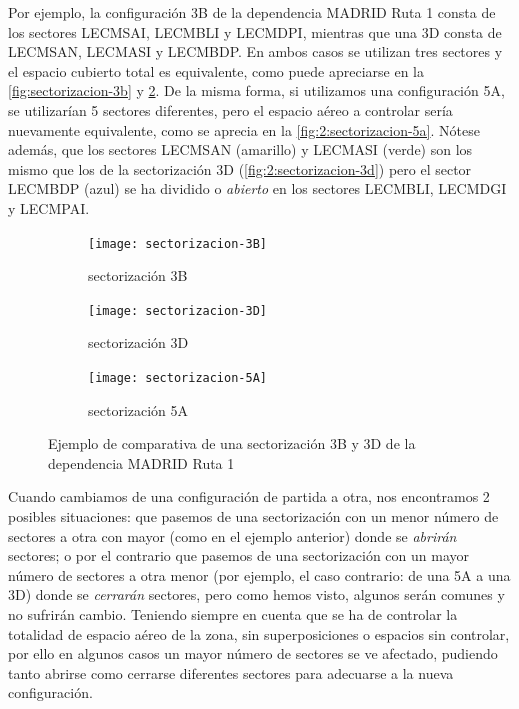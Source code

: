Por ejemplo, la configuración 3B de la dependencia MADRID Ruta 1 consta de los sectores LECMSAI, LECMBLI y LECMDPI, mientras que una 3D consta de LECMSAN, LECMASI y LECMBDP. En ambos casos se utilizan tres sectores y el espacio cubierto total es equivalente, como puede apreciarse en la \autoref{fig:sectorizacion-3b} y \ref{fig:2:sectorizacion-3d}.
De la misma forma, si utilizamos una configuración 5A, se utilizarían 5 sectores diferentes, pero el espacio aéreo a controlar sería nuevamente equivalente, como se aprecia en la \autoref{fig:2:sectorizacion-5a}.
Nótese además, que los sectores LECMSAN (amarillo) y LECMASI (verde) son los mismo que los de la sectorización 3D (\autoref{fig:2:sectorizacion-3d}) pero el sector LECMBDP (azul) se ha dividido o \textit{abierto} en los sectores LECMBLI, LECMDGI y LECMPAI.

\begin{figure}[htbp]
    \centering
    \begin{subfigure}{\linewidth}
        \centering
        \texttt{[image: sectorizacion-3B]}
        \caption{sectorización 3B\linebreak}
        \label{fig:sectorizacion-3b}
    \end{subfigure}

    \begin{subfigure}{\linewidth}
        \centering
        \texttt{[image: sectorizacion-3D]}
        \caption{sectorización 3D\linebreak}
        \label{fig:2:sectorizacion-3d}
    \end{subfigure}

    \begin{subfigure}{\linewidth}
        \centering
        \texttt{[image: sectorizacion-5A]}
        \caption{sectorización 5A}
        \label{fig:2:sectorizacion-5a}
    \end{subfigure}

    \caption[Ejemplo de sectorización 3B y 3D de la dependencia MADRID Ruta 1]{Ejemplo de comparativa de una 
    sectorización 3B y 3D 
    de la dependencia MADRID Ruta 1}
    \label{fig:2:comparativa3B-3D}
\end{figure}


Cuando cambiamos de una configuración de partida a otra, nos encontramos 2 posibles situaciones: que pasemos de una sectorización con un menor número de sectores a otra con mayor (como en el ejemplo anterior) donde se \textit{abrirán} sectores; o por el contrario que pasemos de una sectorización con un mayor número de sectores a otra menor (por ejemplo, el caso contrario: de una 5A a una 3D) donde se \textit{cerrarán} sectores, pero como hemos visto, algunos serán comunes y no sufrirán cambio. 
Teniendo siempre en cuenta que se ha de controlar la totalidad de espacio aéreo de la zona, sin superposiciones o espacios sin controlar, por ello en algunos casos un mayor número de sectores se ve afectado, pudiendo tanto abrirse como cerrarse diferentes sectores para adecuarse a la nueva configuración.

